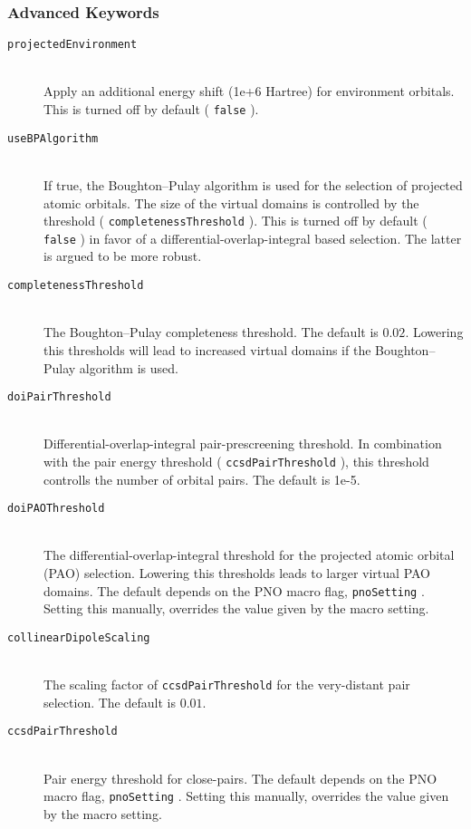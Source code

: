 \documentclass[bibliography=totocnumbered,a4paper,10pt,oneside]{scrbook}
\newcommand{\ttt}[1]{%
  \begingroup\setlength{\fboxsep}{1pt}%
  \colorbox{serenity-green!30}{\texttt{\hspace*{2pt}\vphantom{(g}#1\hspace*{2pt}}}%
  \endgroup
}
\begin{document}
\subsubsection{Advanced Keywords}
\begin{description}
    \item [\texttt{projectedEnvironment}]\hfill \\
    Apply an additional energy shift (1e+6 Hartree) for environment orbitals.
    This is turned off by default (\ttt{false}).
    \item [\texttt{useBPAlgorithm}]\hfill \\
    If true, the Boughton--Pulay algorithm is used for the selection of projected atomic orbitals. The size of the
    virtual domains is controlled by the threshold (\ttt{completenessThreshold}). This is turned off by default
    (\ttt{false}) in favor of a differential-overlap-integral based selection. The latter is argued to be more robust.
    \item [\texttt{completenessThreshold}]\hfill \\
    The Boughton--Pulay completeness threshold. The default is $0.02$. Lowering this thresholds will lead to
    increased virtual domains if the Boughton--Pulay algorithm is used.
    \item [\texttt{doiPairThreshold}]\hfill \\
    Differential-overlap-integral pair-prescreening threshold. In combination with the pair energy threshold
    (\ttt{ccsdPairThreshold}), this threshold controlls the number of orbital pairs.
    The default is 1e-5.
    \item [\texttt{doiPAOThreshold}]\hfill \\
    The differential-overlap-integral threshold for the projected atomic orbital (PAO) selection. Lowering this
    thresholds leads to larger virtual PAO domains. The default depends on the PNO macro flag,
    \ttt{pnoSetting}. Setting this manually, overrides the value given by the macro setting.
    \item [\texttt{collinearDipoleScaling}]\hfill \\
    The scaling factor of \ttt{ccsdPairThreshold} for the very-distant pair selection.
    The default is $0.01$.
    \item [\texttt{ccsdPairThreshold}]\hfill \\
    Pair energy threshold for close-pairs. The default depends on the PNO macro flag, \ttt{pnoSetting}.
    Setting this manually, overrides the value given by the macro setting.

\end{description}
\end{document}
